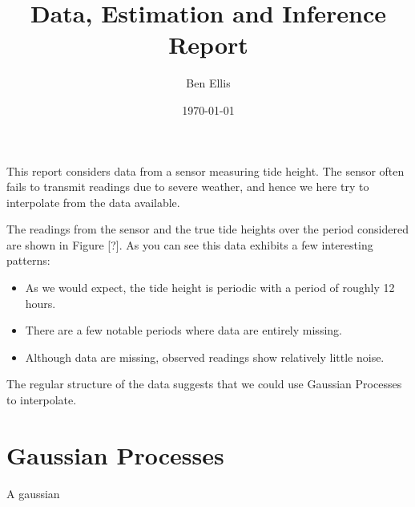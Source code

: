 \documentclass{article}
\begin{document}
\title{Data, Estimation and Inference Report}
\author{Ben Ellis}
\date{\today}
\maketitle

This report considers data from a sensor measuring tide height.
The sensor often fails to transmit readings due to severe weather, and 
hence we here try to interpolate from the data available.

The readings from the sensor and the true tide heights over the period 
considered are shown in Figure [?]. 
As you can see this data exhibits a few interesting patterns:
\begin{itemize}
    \item As we would expect, the tide height is periodic with a period of roughly 12 hours.
    \item There are a few notable periods where data are entirely missing.
    \item Although data are missing, observed readings show relatively little noise.
\end{itemize}

The regular structure of the data suggests that we could use Gaussian Processes to interpolate.

\section*{Gaussian Processes}

A gaussian
\end{document}
